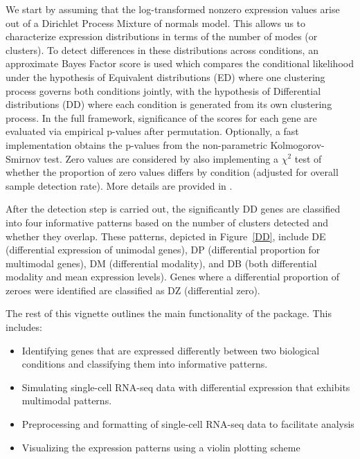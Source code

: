 \documentclass{article}
\begin{document}
We start by assuming that the log-transformed nonzero expression values arise out of a Dirichlet Process Mixture of normals model.  This allows us to characterize expression distributions in terms of the number of modes (or clusters).  To detect differences in these distributions across conditions, an approximate Bayes Factor score is used which compares the conditional likelihood under the hypothesis of Equivalent distributions (ED) where one clustering process governs both conditions jointly, with the hypothesis of Differential distributions (DD) where each condition is generated from its own clustering process.  In the full framework, significance of the scores for each gene are evaluated via empirical p-values after permutation.  Optionally, a fast implementation obtains the p-values from the non-parametric Kolmogorov-Smirnov test.  Zero values are considered by also implementing a $\chi^2$ test of whether the proportion of zero values differs by condition (adjusted for overall sample detection rate).  More details are provided in \cite{korthauer2015}.

After the detection step is carried out, the significantly DD genes are classified into four informative patterns based on the number of clusters detected and whether they overlap.  These patterns, depicted in Figure~\ref{DD}, include DE (differential expression of unimodal genes), DP (differential proportion for multimodal genes), DM (differential modality), and DB (both differential modality and mean expression levels).  Genes where a differential proportion of zeroes were identified are classified as DZ (differential zero).


The rest of this vignette outlines the main functionality of the  package.  This includes:

\begin{itemize}
  \item Identifying genes that are expressed differently between two biological conditions and classifying them into informative patterns.
  \item Simulating single-cell RNA-seq data with differential expression that exhibits multimodal patterns.
  \item Preprocessing and formatting of single-cell RNA-seq data to facilitate analysis
  \item Visualizing the expression patterns using a violin plotting scheme
\end{itemize}
\end{document}
